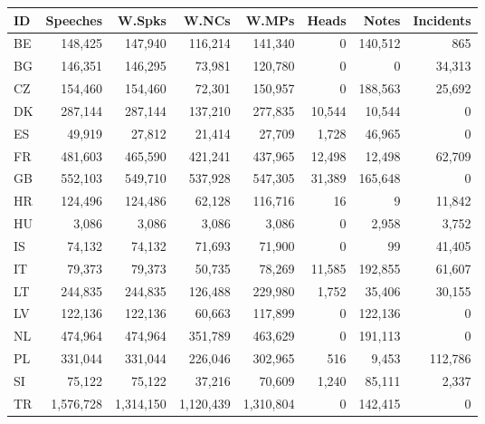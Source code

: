 \begin{tabular}{l|rrrrrrr}
ID&Speeches&W.Spks&W.NCs&W.MPs&Heads&Notes&Incidents\\
\hline
BE&148,425&147,940&116,214&141,340&0&140,512&865\\
BG&146,351&146,295&73,981&120,780&0&0&34,313\\
CZ&154,460&154,460&72,301&150,957&0&188,563&25,692\\
DK&287,144&287,144&137,210&277,835&10,544&10,544&0\\
ES&49,919&27,812&21,414&27,709&1,728&46,965&0\\
FR&481,603&465,590&421,241&437,965&12,498&12,498&62,709\\
GB&552,103&549,710&537,928&547,305&31,389&165,648&0\\
HR&124,496&124,486&62,128&116,716&16&9&11,842\\
HU&3,086&3,086&3,086&3,086&0&2,958&3,752\\
IS&74,132&74,132&71,693&71,900&0&99&41,405\\
IT&79,373&79,373&50,735&78,269&11,585&192,855&61,607\\
LT&244,835&244,835&126,488&229,980&1,752&35,406&30,155\\
LV&122,136&122,136&60,663&117,899&0&122,136&0\\
NL&474,964&474,964&351,789&463,629&0&191,113&0\\
PL&331,044&331,044&226,046&302,965&516&9,453&112,786\\
SI&75,122&75,122&37,216&70,609&1,240&85,111&2,337\\
TR&1,576,728&1,314,150&1,120,439&1,310,804&0&142,415&0\\
\end{tabular}
